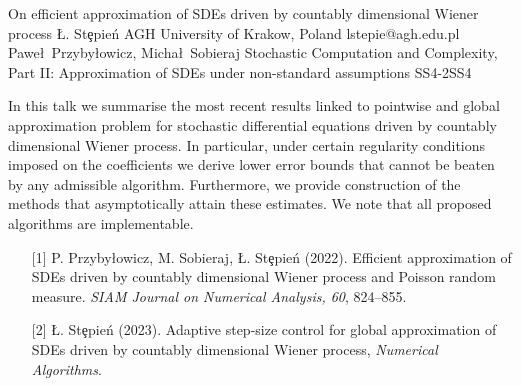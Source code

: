 \begin{talk}
  {On efficient approximation of SDEs driven by countably dimensional Wiener process}%
  {\L. St\c epie\'n}%
  {AGH University of Krakow, Poland}%
  {lstepie@agh.edu.pl}%
  {Pawe\l \ Przyby\l owicz, Micha\l \ Sobieraj}%
{Stochastic Computation and Complexity, Part II: Approximation of SDEs under non-standard assumptions}
{}{SS4-2}{SS4}

			
In this talk we summarise the most recent results linked to pointwise and global approximation problem for stochastic differential equations driven by countably dimensional Wiener process. In particular, under certain regularity conditions imposed on the coefficients we derive lower error bounds that cannot be beaten by any admissible algorithm. Furthermore, we provide construction of the methods that asymptotically attain these estimates. We note that all proposed algorithms are implementable.


\medskip

\begin{enumerate}
	\item[{[1]}] P. Przyby\l owicz, M. Sobieraj, \L. St\c epie\'n (2022). Efficient approximation of SDEs driven by countably
dimensional Wiener process and Poisson random measure. \textit{SIAM Journal on Numerical Analysis, 60}, 824--855.
	\item[{[2]}] \L. St\c epie\'n (2023). Adaptive step-size control for global approximation of SDEs driven by countably dimensional Wiener process, \textit{Numerical Algorithms}.
\end{enumerate}

\end{talk}

